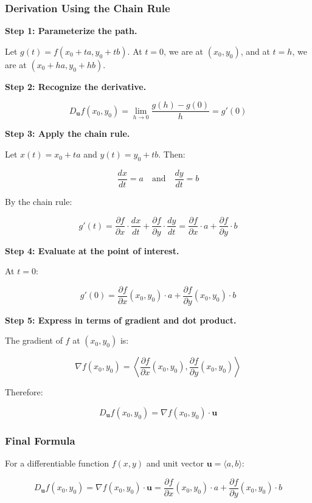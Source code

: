 \subsubsection{Derivation Using the Chain Rule}

\textbf{Step 1: Parameterize the path.}

Let \(g(t) = f(x_0 + ta, y_0 + tb)\). At \(t = 0\), we are at \((x_0, y_0)\), and at \(t = h\), we are at \((x_0 + ha, y_0 + hb)\).

\textbf{Step 2: Recognize the derivative.}

\[
  D_{\mathbf{u}}f(x_0, y_0) = \lim_{h \to 0} \frac{g(h) - g(0)}{h} = g'(0)
\]

\textbf{Step 3: Apply the chain rule.}

Let \(x(t) = x_0 + ta\) and \(y(t) = y_0 + tb\). Then:

\[
  \frac{dx}{dt} = a \quad \text{and} \quad \frac{dy}{dt} = b
\]

By the chain rule:

\[
  g'(t) = \frac{\partial f}{\partial x} \cdot \frac{dx}{dt} + \frac{\partial f}{\partial y} \cdot \frac{dy}{dt} = \frac{\partial f}{\partial x} \cdot a + \frac{\partial f}{\partial y} \cdot b
\]

\textbf{Step 4: Evaluate at the point of interest.}

At \(t = 0\):

\[
  g'(0) = \frac{\partial f}{\partial x}(x_0, y_0) \cdot a + \frac{\partial f}{\partial y}(x_0, y_0) \cdot b
\]

\textbf{Step 5: Express in terms of gradient and dot product.}

The gradient of \(f\) at \((x_0, y_0)\) is:

\[
  \nabla f(x_0, y_0) = \left\langle \frac{\partial f}{\partial x}(x_0, y_0), \frac{\partial f}{\partial y}(x_0, y_0) \right\rangle
\]

Therefore:

\[
  D_{\mathbf{u}}f(x_0, y_0) = \nabla f(x_0, y_0) \cdot \mathbf{u}
\]

\subsubsection{Final Formula}

For a differentiable function \(f(x, y)\) and unit vector \(\mathbf{u} = \langle a, b \rangle\):

\[
  \boxed{D_{\mathbf{u}}f(x_0, y_0) = \nabla f(x_0, y_0) \cdot \mathbf{u} = \frac{\partial f}{\partial x}(x_0, y_0) \cdot a + \frac{\partial f}{\partial y}(x_0, y_0) \cdot b}
\]

